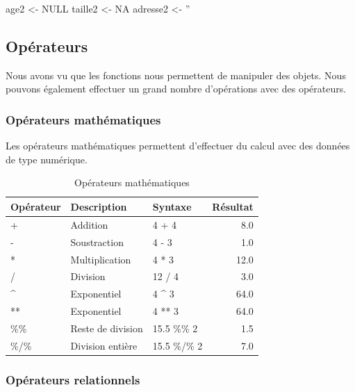 \documentclass[
  11pt,
  french,
]{book}
\makeatletter
\newenvironment{Shaded}{\begin{snugshade}}{\end{snugshade}}
\newcommand{\NormalTok}[1]{#1}
\newcommand{\OtherTok}[1]{\textcolor[rgb]{0.56,0.35,0.01}{#1}}
\newcommand{\StringTok}[1]{\textcolor[rgb]{0.31,0.60,0.02}{#1}}
\newenvironment{kframe}{%
\medskip{}
\setlength{\fboxsep}{.8em}
 \def\at@end@of@kframe{}%
 \ifinner\ifhmode%
  \def\at@end@of@kframe{\end{minipage}}%
  \begin{minipage}{\columnwidth}%
 \fi\fi%
 \def\FrameCommand##1{\hskip\@totalleftmargin \hskip-\fboxsep
 \colorbox{shadecolor}{##1}\hskip-\fboxsep
     \hskip-\linewidth \hskip-\@totalleftmargin \hskip\columnwidth}%
 \MakeFramed {\advance\hsize-\width
   \@totalleftmargin\z@ \linewidth\hsize
   \@setminipage}}%
 {\par\unskip\endMakeFramed%
 \at@end@of@kframe}
\renewenvironment{Shaded}{\begin{kframe}}{\end{kframe}}
\makeatother
\begin{document}
\begin{Shaded}
\begin{Highlighting}[]
\NormalTok{age2 <-}\StringTok{ }\OtherTok{NULL}
\NormalTok{taille2 <-}\StringTok{ }\OtherTok{NA}
\NormalTok{adresse2 <-}\StringTok{ ''}
\end{Highlighting}
\end{Shaded}

\hypertarget{sect0135}{%
\subsection{Opérateurs}\label{sect0135}}

Nous avons vu que les fonctions nous permettent de manipuler des objets. Nous pouvons également effectuer un grand nombre d'opérations avec des opérateurs.

\hypertarget{sect01351}{%
\subsubsection{Opérateurs mathématiques}\label{sect01351}}

Les opérateurs mathématiques permettent d'effectuer du calcul avec des données de type numérique.

\begin{table}

\caption{\label{tab:tableOperateurMath}Opérateurs mathématiques}
\centering
\fontsize{8}{10}\selectfont
\begin{tabular}[t]{lllr}
\toprule
Opérateur & Description & Syntaxe & Résultat\\
\midrule
+ & Addition & 4 + 4 & 8.0\\
- & Soustraction & 4 - 3 & 1.0\\
* & Multiplication & 4 * 3 & 12.0\\
/ & Division & 12 / 4 & 3.0\\
\textasciicircum{} & Exponentiel & 4 \textasciicircum{} 3 & 64.0\\
\addlinespace
** & Exponentiel & 4 ** 3 & 64.0\\
\%\% & Reste de division & 15.5 \%\% 2 & 1.5\\
\%/\% & Division entière & 15.5 \%/\% 2 & 7.0\\
\bottomrule
\end{tabular}
\end{table}

\hypertarget{sect01352}{%
\subsubsection{Opérateurs relationnels}\label{sect01352}}
\end{document}
